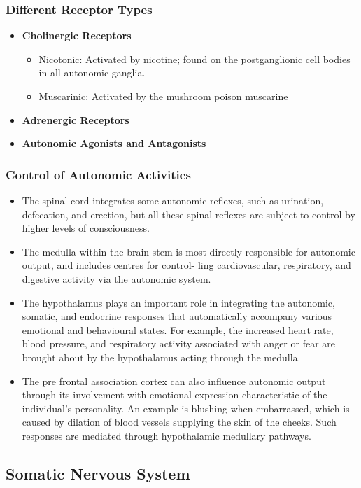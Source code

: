 \documentclass[11pt]{article}
\begin{document}
\subsubsection{Different Receptor Types}
\begin{itemize}
\item \textbf{Cholinergic Receptors}
\begin{itemize}
\item Nicotonic: Activated by nicotine; found on the postganglionic cell bodies in all autonomic ganglia. 
\item Muscarinic: Activated by the mushroom poison muscarine
\end{itemize}
\item \textbf{Adrenergic Receptors}
\item \textbf{Autonomic Agonists and Antagonists}
\end{itemize}

\subsubsection{Control of Autonomic Activities}
\begin{itemize}
\item The spinal cord integrates some autonomic reflexes, such as urination, defecation, and erection, but all these spinal reflexes are subject to control by higher levels of consciousness.
\item The medulla within the brain stem is most directly responsible for autonomic output, and includes centres for control- ling cardiovascular, respiratory, and digestive activity via the autonomic system.
\item The hypothalamus plays an important role in integrating the autonomic, somatic, and endocrine responses that automatically accompany various emotional and behavioural states. For example, the increased heart rate, blood pressure, and respiratory activity associated with anger or fear are brought about by the hypothalamus acting through the medulla.
\item The pre frontal association cortex can also influence autonomic output through its involvement with emotional expression characteristic of the individual's personality. An example is blushing when embarrassed, which is caused by dilation of
blood vessels supplying the skin of the cheeks. Such responses are mediated through hypothalamic medullary pathways.
\end{itemize}

\subsection{Somatic Nervous System}
\end{document}
